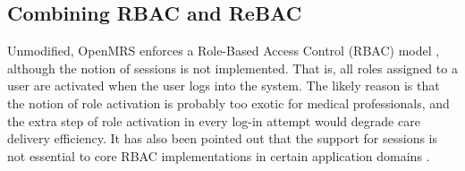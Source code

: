 \documentclass{acm_proc_article-sp}
\newcommand{\ToDo}[1]{\emph{[\textbf{To Do:} #1]}}
\begin{document}
\begin{comment}
This lesson is confirmed by our parallel and still not yet successful
efforts to incorporate ReBAC into XWiki, a wiki-style content
management system designed for enterprise environments \cite{XWiki}.
The lack of modularity in its implementation of authorization checks
is the main technical hurdle.


\ToDo{
\begin{itemize}
\item either tune down accusation or explain in more precise terms
  why it is hard to implement ReBAC in XWiki.
\item access request sent to authorization module: (user, page)
\item page can have multi actions executed upon it (e.g., view, edit,
  change
  name, etc)
\item all such auth decisions are made 
\item what is returned is a list is a list of authorizations (i.e.,
  can the page be viewed, edited, name change, etc)
\item at this point we don't know what the user wants to do
\item not able to append the appropriate edge in authorization graph
  (in csc work)
\item so we don't have issue with authorization in XWiki, we have
  issue
  with determining what edges to add or remove
\item So we will face the same problem when we are to implement admin
  actions
  in XWiki
\item  authorization code has its own module
\item multiple caller modules
\end{itemize}
}

\end{comment}

\subsection{Combining RBAC and ReBAC}

Unmodified, OpenMRS enforces a Role-Based Access Control (RBAC) model
\cite{Sandhu-etal:1996}, although the notion of sessions is not
implemented.  That is, all roles assigned to a user are activated when
the user logs into the system.  The likely reason is that the notion
of role activation is probably too exotic for medical professionals,
and the extra step of role activation in every log-in attempt would
degrade care delivery efficiency. It has also been pointed out that
the support for sessions is not essential to core RBAC implementations
in certain application domains \cite{CritiqueANSI}.
\end{document}
